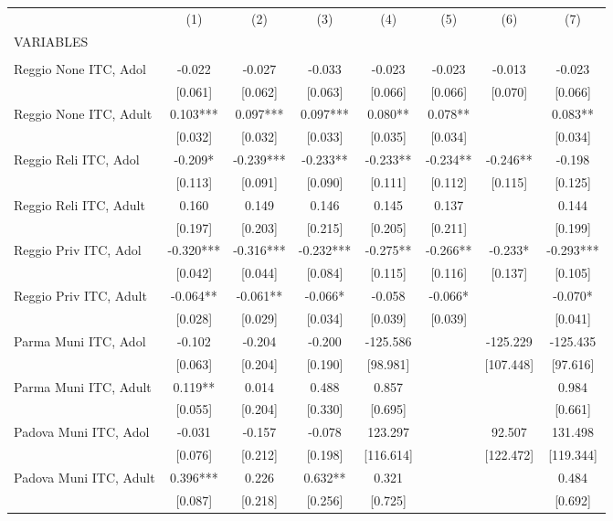 \begin{tabular}{lccccccc} \hline
 & (1) & (2) & (3) & (4) & (5) & (6) & (7) \\
VARIABLES &  &  &  &  &  &  &  \\ \hline
 &  &  &  &  &  &  &  \\
Reggio None ITC, Adol & -0.022 & -0.027 & -0.033 & -0.023 & -0.023 & -0.013 & -0.023 \\
 & [0.061] & [0.062] & [0.063] & [0.066] & [0.066] & [0.070] & [0.066] \\
Reggio None ITC, Adult & 0.103*** & 0.097*** & 0.097*** & 0.080** & 0.078** &  & 0.083** \\
 & [0.032] & [0.032] & [0.033] & [0.035] & [0.034] &  & [0.034] \\
Reggio Reli ITC, Adol & -0.209* & -0.239*** & -0.233** & -0.233** & -0.234** & -0.246** & -0.198 \\
 & [0.113] & [0.091] & [0.090] & [0.111] & [0.112] & [0.115] & [0.125] \\
Reggio Reli ITC, Adult & 0.160 & 0.149 & 0.146 & 0.145 & 0.137 &  & 0.144 \\
 & [0.197] & [0.203] & [0.215] & [0.205] & [0.211] &  & [0.199] \\
Reggio Priv ITC, Adol & -0.320*** & -0.316*** & -0.232*** & -0.275** & -0.266** & -0.233* & -0.293*** \\
 & [0.042] & [0.044] & [0.084] & [0.115] & [0.116] & [0.137] & [0.105] \\
Reggio Priv ITC, Adult & -0.064** & -0.061** & -0.066* & -0.058 & -0.066* &  & -0.070* \\
 & [0.028] & [0.029] & [0.034] & [0.039] & [0.039] &  & [0.041] \\
Parma Muni ITC, Adol & -0.102 & -0.204 & -0.200 & -125.586 &  & -125.229 & -125.435 \\
 & [0.063] & [0.204] & [0.190] & [98.981] &  & [107.448] & [97.616] \\
Parma Muni ITC, Adult & 0.119** & 0.014 & 0.488 & 0.857 &  &  & 0.984 \\
 & [0.055] & [0.204] & [0.330] & [0.695] &  &  & [0.661] \\
Padova Muni ITC, Adol & -0.031 & -0.157 & -0.078 & 123.297 &  & 92.507 & 131.498 \\
 & [0.076] & [0.212] & [0.198] & [116.614] &  & [122.472] & [119.344] \\
Padova Muni ITC, Adult & 0.396*** & 0.226 & 0.632** & 0.321 &  &  & 0.484 \\
 & [0.087] & [0.218] & [0.256] & [0.725] &  &  & [0.692] \\

\end{tabular}

